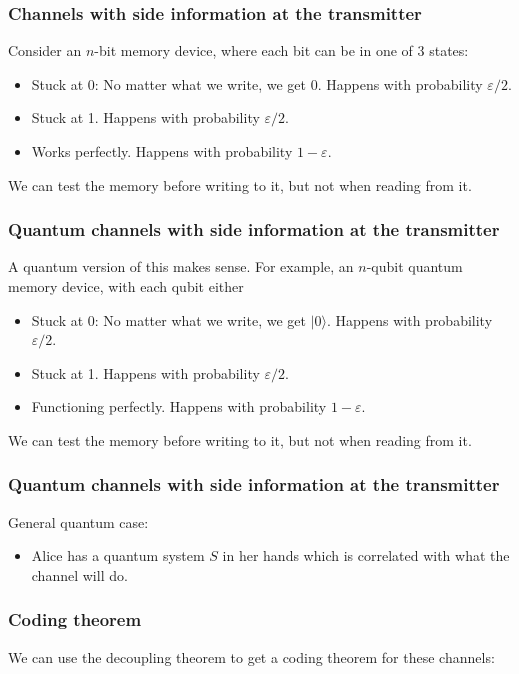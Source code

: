 \documentclass[12pt]{beamer}
\newcommand{\ket}[1]{|#1 \rangle}
\begin{document}
\begin{frame}
	\frametitle{Channels with side information at the transmitter}
	Consider an $n$-bit memory device, where each bit can be in one of 3 states:
	\begin{itemize}
		\item Stuck at 0: No matter what we write, we get 0. Happens with probability $\varepsilon/2$.
		\item Stuck at 1. Happens with probability $\varepsilon/2$.
		\item Works perfectly. Happens with probability $1-\varepsilon$.
	\end{itemize}
	We can test the memory before writing to it, but not when reading from it.
\end{frame}

\begin{frame}
	\frametitle{Quantum channels with side information at the transmitter}
	A quantum version of this makes sense. For example, an $n$-qubit quantum memory device, with each qubit either
	\begin{itemize}
		\item Stuck at 0: No matter what we write, we get $\ket{0}$. Happens with probability $\varepsilon/2$.
		\item Stuck at 1. Happens with probability $\varepsilon/2$.
		\item Functioning perfectly. Happens with probability $1-\varepsilon$.
	\end{itemize}
	We can test the memory before writing to it, but not when reading from it.
\end{frame}

\begin{frame}
	\frametitle{Quantum channels with side information at the transmitter}
	General quantum case:
	\begin{itemize}
		\item Alice has a quantum system $S$ in her hands which is correlated with what the channel will do.
	\end{itemize}
    \begin{figure}
    \scalebox{0.9}{}
    \end{figure}
\end{frame}

\begin{frame}
	\frametitle{Coding theorem}
	We can use the decoupling theorem to get a coding theorem for these channels:
    \begin{figure}
    \scalebox{0.9}{}
    \end{figure}
\end{frame}
\end{document}
